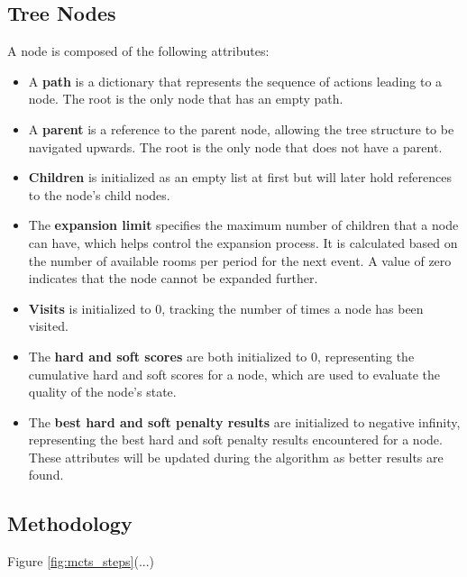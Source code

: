 
\subsection{Tree Nodes}

A node is composed of the following attributes:

\begin{itemize}
\item A \textbf{path} is a dictionary that represents the sequence of actions leading to a node. The root is the only node that has an empty path.

\item A \textbf{parent} is a reference to the parent node, allowing the tree structure to be navigated upwards. The root is the only node that does not have a parent.

\item \textbf{Children} is initialized as an empty list at first but will later hold references to the node's child nodes. 

\item The \textbf{expansion limit} specifies the maximum number of children that a node can have, which helps control the expansion process. It is calculated based on the number of available rooms per period for the next event. A value of zero indicates that the node cannot be expanded further.

\item \textbf{Visits} is initialized to 0, tracking the number of times a node has been visited.

\item The \textbf{hard and soft scores} are both initialized to 0, representing the cumulative hard and soft scores for a node, which are used to evaluate the quality of the node's state.

\item The \textbf{best hard and soft penalty results} are initialized to negative infinity, representing the best hard and soft penalty results encountered for a node. These attributes will be updated during the algorithm as better results are found. 
\end{itemize}

\subsection{Methodology}

Figure \ref{fig:mcts_steps}(...)

